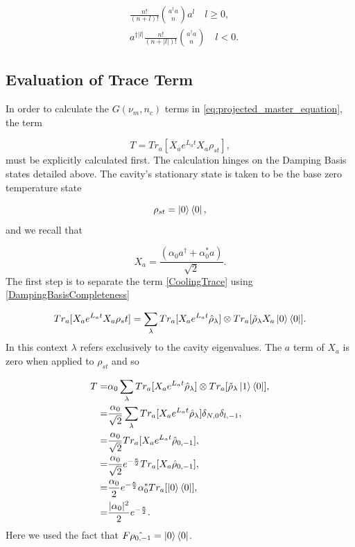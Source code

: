 \documentclass[reprint, amsmath,amssymb, aps,pra]{revtex4-1}
\begin{document}
\begin{align}\label{DefDBDualZero}
&\frac{n!}{(n+l)!}\binom{a^\dagger a}{n}a^l \quad l \geq 0, \\
&a^{\dagger|l|}\frac{n!}{(n+|l|)!}\binom{a^\dagger a}{n} \quad l < 0.
\end{align}

\subsection{Evaluation of Trace Term}\label{TraceAppendix}

In order to calculate the $G(\nu_m,n_c)$ terms in \eqref{eq:projected_master_equation}, the term

\begin{equation}\label{CoolingTrace}
T=Tr_a[X_ae^{L_at}X_a\rho_{st}],
\end{equation} must be explicitly calculated first. The calculation hinges on the Damping Basis states detailed above. The cavity's stationary state is taken to be the base zero temperature state

\begin{equation}
\rho_{st} = \Ket{0}\Bra{0},
\end{equation} and we recall that

\begin{equation}
X_a = \frac{(\alpha_0a^{\dagger}+\alpha_0^*a)}{\sqrt{2}}.
\end{equation} The first step is to separate the term \eqref{CoolingTrace} using \eqref{DampingBasisCompleteness}

\begin{equation}
Tr_a[X_ae^{L_at}X_a\rho_st] = \sum_\lambda Tr_a[X_ae^{L_at}\hat{\rho}_\lambda] \otimes Tr_a[\check{\rho}_\lambda X_a\Ket{0}\Bra{0}].
\end{equation} In this context $\lambda$ refers exclusively to the cavity eigenvalues. The $a$ term of $X_a$ is zero when applied to $\rho_{st}$ and so 

\begin{align}
T=& \alpha_0\sum_\lambda Tr_a[X_ae^{L_at}\hat{\rho}_\lambda] \otimes Tr_a[\check{\rho}_\lambda\Ket{1}\Bra{0}],\\
=&\frac{\alpha_0}{\sqrt{2}}\sum_\lambda Tr_a[X_ae^{L_at}\hat{\rho}_\lambda] \delta_{N,0}\delta_{l,-1},\\
=&\frac{\alpha_0}{\sqrt{2}} Tr_a[X_ae^{L_at}\hat{\rho}_{0,-1}],\\
=&\frac{\alpha_0}{\sqrt{2}}e^{-\frac{\kappa}{2}} Tr_a[X_a\hat{\rho}_{0,-1}],\\
=&\frac{\alpha_0}{2}e^{-\frac{\kappa}{2}}\alpha_0^*Tr_a[\Ket{0}\Bra{0}],\\
=&\frac{|\alpha_0|^2}{2}e^{-\frac{\kappa}{2}}.
\end{align} Here we used the fact that $F\hat{\rho_{0,-1}}=\Ket{0}\Bra{0}$. 









\end{document}
